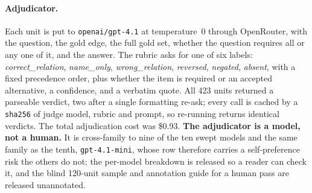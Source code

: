 \documentclass[10pt,twocolumn]{article}
\begin{document}
\paragraph{Adjudicator.} Each unit is put to \texttt{openai/gpt-4.1} at temperature~0 through OpenRouter, with the question, the gold edge, the full gold set, whether the question requires all or any one of it, and the answer. The rubric asks for one of six labels: \emph{correct\_relation}, \emph{name\_only}, \emph{wrong\_relation}, \emph{reversed}, \emph{negated}, \emph{absent}, with a fixed precedence order, plus whether the item is required or an accepted alternative, a confidence, and a verbatim quote. All 423 units returned a parseable verdict, two after a single formatting re-ask; every call is cached by a \texttt{sha256} of judge model, rubric and prompt, so re-running returns identical verdicts. The total adjudication cost was \$0.93. \textbf{The adjudicator is a model, not a human.} It is cross-family to nine of the ten swept models and the same family as the tenth, \texttt{gpt-4.1-mini}, whose row therefore carries a self-preference risk the others do not; the per-model breakdown is released so a reader can check it, and the blind 120-unit sample and annotation guide for a human pass are released unannotated.
\end{document}

